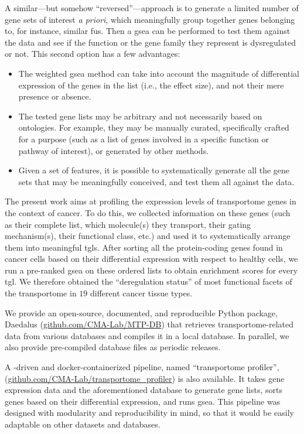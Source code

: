 A similar---but somehow ``reversed''---approach is to generate a limited number of gene sets of interest \textit{a priori}, which meaningfully group together genes belonging to, for instance, similar \glspl{fu}.
Then a \gls{gsea} can be performed to test them against the data and see if the function or the gene family they represent is dysregulated or not.
This second option has a few advantages:
\begin{itemize}
    \item The weighted \gls{gsea} method can take into account the magnitude of differential expression of the genes in the list (i.e., the effect size), and not their mere presence or absence.
    \item The tested gene lists may be arbitrary and not necessarily based on ontologies.
    For example, they may be manually curated, specifically crafted for a purpose (such as a list of genes involved in a specific function or pathway of interest), or generated by other methods.
    \item Given a set of features, it is possible to systematically generate all the gene sets that may be meaningfully conceived, and test them all against the data.
\end{itemize}

The present work aims at profiling the expression levels of transportome genes in the context of cancer.
To do this, we collected information on these genes (such as their complete list, which molecule(s) they transport, their gating mechanism(s), their functional class, etc.) and used it to systematically arrange them into meaningful \glspl{tgl}. %
After sorting all the protein-coding genes found in cancer cells based on their differential expression with respect to healthy cells, we run a pre-ranked \gls{gsea} on these ordered lists to obtain enrichment scores for every \gls{tgl}.
We therefore obtained the ``deregulation status'' of most functional facets of the transportome in $19$ different cancer tissue types.

We provide an open-source, documented, and reproducible Python package, Daedalus (\href{https://github.com/CMA-Lab/MTP-DB}{github.com/CMA-Lab/MTP-DB}) that retrieves transportome-related data from various databases and compiles it in a local  database.
In parallel, we also provide pre-compiled database files as periodic releases.

A -driven and docker-containerized pipeline, named ``transportome profiler'', (\href{https://github.com/CMA-Lab/transportome_profiler}{github.com/CMA-Lab/transportome\_profiler}) is also available.
It takes gene expression data and the aforementioned database to generate gene lists, sorts genes based on their differential expression, and runs \gls{gsea}.
This pipeline was designed with modularity and reproducibility in mind, so that it would be easily adaptable on other datasets and databases.
